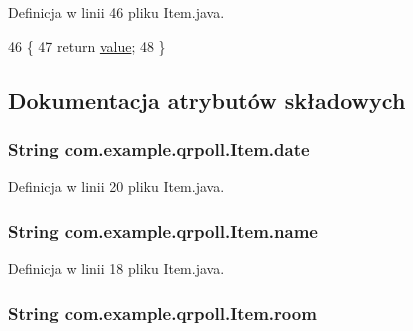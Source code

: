 Definicja w linii 46 pliku Item.\+java.


\begin{DoxyCode}
46                             \{
47         \textcolor{keywordflow}{return} \hyperlink{classcom_1_1example_1_1qrpoll_1_1_item_abc0a6b74f1923ca042b9b9d3b48f014c}{value};
48     \}
\end{DoxyCode}


\subsection{Dokumentacja atrybutów składowych}
\hypertarget{classcom_1_1example_1_1qrpoll_1_1_item_a47b12c3c00c7a7a9deddb47f139af3cc}{
\subsubsection[{date}]{\setlength{\rightskip}{0pt plus 5cm}String com.\+example.\+qrpoll.\+Item.\+date\hspace{0.3cm}{\ttfamily [private]}}}\label{classcom_1_1example_1_1qrpoll_1_1_item_a47b12c3c00c7a7a9deddb47f139af3cc}


Definicja w linii 20 pliku Item.\+java.

\hypertarget{classcom_1_1example_1_1qrpoll_1_1_item_a70600dc1190682886f0976b418f13a76}{
\subsubsection[{name}]{\setlength{\rightskip}{0pt plus 5cm}String com.\+example.\+qrpoll.\+Item.\+name\hspace{0.3cm}{\ttfamily [private]}}}\label{classcom_1_1example_1_1qrpoll_1_1_item_a70600dc1190682886f0976b418f13a76}


Definicja w linii 18 pliku Item.\+java.

\hypertarget{classcom_1_1example_1_1qrpoll_1_1_item_ad54518f2889a23bb19316b92711a655c}{
\subsubsection[{room}]{\setlength{\rightskip}{0pt plus 5cm}String com.\+example.\+qrpoll.\+Item.\+room\hspace{0.3cm}{\ttfamily [private]}}}\label{classcom_1_1example_1_1qrpoll_1_1_item_ad54518f2889a23bb19316b92711a655c}


